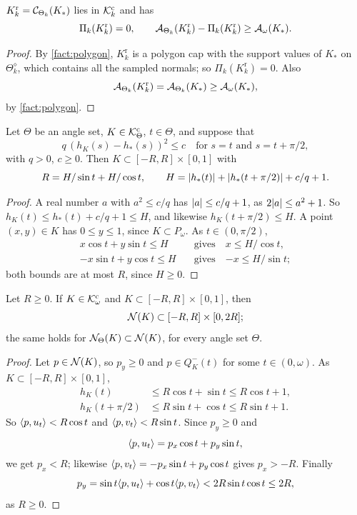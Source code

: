 \begin{lemma}\label{lem:recovery}
$K^{\mathrm r}_k=\mathcal{C}_{\Theta_k}(K_*)$ lies in $\mathcal{K}^{\mathrm{c}}_k$ and has
\[
  \Pi_k(K^{\mathrm r}_k)=0,\qquad
  \mathcal{A}_{\Theta_k}(K^{\mathrm r}_k)-\Pi_k(K^{\mathrm r}_k)\ge\mathcal{A}_\omega(K_*).
\]
\end{lemma}

\begin{proof}
By \cref{fact:polygon}, $K^{\mathrm r}_k$ is a polygon cap with the support
values of $K_*$ on $\Theta_k^\diamond$, which contains all the sampled normals;
so $\Pi_k(K^{\mathrm r}_k)=0$. Also
\[
  \mathcal{A}_{\Theta_k}(K^{\mathrm r}_k)=\mathcal{A}_{\Theta_k}(K_*)\ge\mathcal{A}_\omega(K_*),
\]
by \cref{fact:polygon}.
\end{proof}

\begin{lemma}\label{lem:box}
Let $\Theta$ be an angle set, $K\in\mathcal{K}^{\mathrm{c}}_\Theta$, $t\in\Theta$, and suppose that
\[
  q\,(h_K(s)-h_*(s))^2\le c\quad\text{for }s=t\text{ and }s=t+\pi/2,
\]
with $q>0$, $c\ge0$. Then $K\subset[-R,R]\times[0,1]$ with
\[
  R=H/\sin t+H/\cos t,\qquad H=\lvert h_*(t)\rvert+\lvert h_*(t+\pi/2)\rvert+c/q+1.
\]
\end{lemma}

\begin{proof}
A real number $a$ with $a^2\le c/q$ has $\lvert a\rvert\le c/q+1$, as $2\lvert a\rvert\le
a^2+1$. So $h_K(t)\le h_*(t)+c/q+1\le H$, and likewise $h_K(t+\pi/2)\le H$. A
point $(x,y)\in K$ has $0\le y\le1$, since $K\subset P_\omega$. As
$t\in(0,\pi/2)$,
\begin{align*}
  x\cos t+y\sin t\le H&\quad\text{gives}\quad x\le H/\cos t,\\
  -x\sin t+y\cos t\le H&\quad\text{gives}\quad{-x}\le H/\sin t;
\end{align*}
both bounds are at most $R$, since $H\ge0$.
\end{proof}

\begin{lemma}\label{lem:nichebox}
Let $R\ge0$. If $K\in\mathcal{K}^{\mathrm{c}}_\omega$ and ${K\subset[-R,R]\times[0,1]}$, then
\[
  \mathcal{N}(K)\subset[-R,R]\times[0,2R];
\]
the same holds for $\mathcal{N}_\Theta(K)\subset\mathcal{N}(K)$, for every angle set $\Theta$.
\end{lemma}

\begin{proof}
Let $p\in\mathcal{N}(K)$, so $p_y\ge0$ and $p\in Q^-_K(t)$ for some $t\in(0,\omega)$. As
$K\subset[-R,R]\times[0,1]$,
\begin{align*}
  h_K(t)&\le R\cos t+\sin t\le R\cos t+1,\\
  h_K(t+\pi/2)&\le R\sin t+\cos t\le R\sin t+1.
\end{align*}
So $\langle p,u_t\rangle<R\cos t$ and $\langle p,v_t\rangle<R\sin t$. Since $p_y\ge0$ and
\[
  \langle p,u_t\rangle=p_x\cos t+p_y\sin t,
\]
we get $p_x<R$; likewise $\langle p,v_t\rangle=-p_x\sin t+p_y\cos t$ gives $p_x>-R$.
Finally
\[
  p_y=\sin t\langle p,u_t\rangle+\cos t\langle p,v_t\rangle<2R\sin t\cos t\le2R,
\]
as $R\ge0$.
\end{proof}

